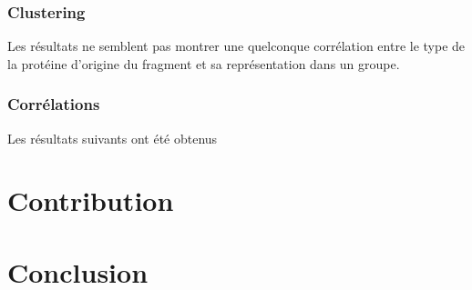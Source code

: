 \documentclass[a4paper, journal, 11pt, onecolumn]{IEEEtran}
\begin{document}
\subsubsection{Clustering}

Les résultats ne semblent pas montrer une quelconque corrélation entre le type
de la protéine d'origine du fragment et sa représentation dans un groupe.

\subsubsection{Corrélations}

Les résultats suivants ont été obtenus

\section{Contribution}



\section*{Conclusion}

\printbibliography
\end{document}
